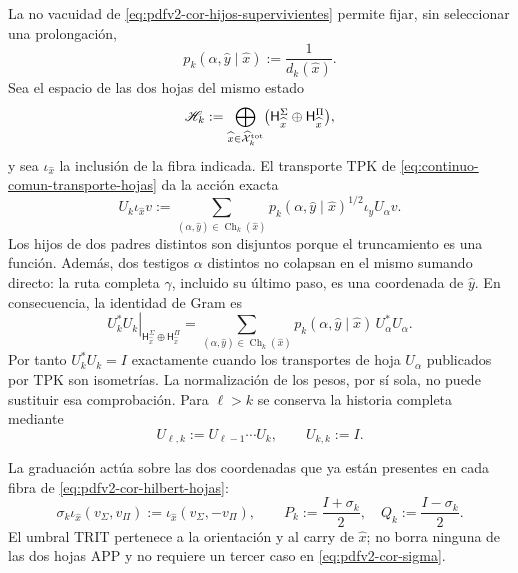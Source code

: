 La no vacuidad de \eqref{eq:pdfv2-cor-hijos-supervivientes} permite fijar,
sin seleccionar una prolongación,
\begin{equation}
\label{eq:pdfv2-cor-peso-conteo}
 p_k(\alpha,\widehat y\mid\widehat x)
 :=\frac1{d_k(\widehat x)}.
\end{equation}
Sea el espacio de las dos hojas del mismo estado
\begin{equation}
\label{eq:pdfv2-cor-hilbert-hojas}
 \mathscr H_k:=
 \bigoplus_{\widehat x\in\widehat{\mathcal X}^{\rm tot}_k}
 \bigl(\mathsf H_{\widehat x}^{\Sigma}
       \oplus\mathsf H_{\widehat x}^{\Pi}\bigr),
\end{equation}
y sea \(\iota_{\widehat x}\) la inclusión de la fibra indicada. El transporte
TPK de \eqref{eq:continuo-comun-transporte-hojas} da la acción exacta
\begin{equation}
\label{eq:pdfv2-cor-u-comun}
 U_k\iota_{\widehat x}v:=
 \sum_{(\alpha,\widehat y)\in\operatorname{Ch}_k(\widehat x)}
 p_k(\alpha,\widehat y\mid\widehat x)^{1/2}
 \iota_{\widehat y}U_\alpha v.
\end{equation}
Los hijos de dos padres distintos son disjuntos porque el truncamiento es una
función. Además, dos testigos \(\alpha\) distintos no colapsan en el mismo
sumando directo: la ruta completa \(\gamma\), incluido su último paso, es una
coordenada de \(\widehat y\). En consecuencia, la identidad de Gram es
\begin{equation}
\label{eq:pdfv2-cor-u-gram}
 \left.U_k^*U_k\right|_{\mathsf H_{\widehat x}^{\Sigma}
       \oplus\mathsf H_{\widehat x}^{\Pi}}
 =
 \sum_{(\alpha,\widehat y)\in\operatorname{Ch}_k(\widehat x)}
 p_k(\alpha,\widehat y\mid\widehat x)\,U_\alpha^*U_\alpha.
\end{equation}
Por tanto \(U_k^*U_k=I\) exactamente cuando los transportes de hoja
\(U_\alpha\) publicados por TPK son isometrías. La normalización de los pesos,
por sí sola, no puede sustituir esa comprobación.
Para \(\ell>k\) se conserva la historia completa mediante
\begin{equation}
\label{eq:pdfv2-cor-u-iterado}
 U_{\ell,k}:=U_{\ell-1}\cdots U_k,
 \qquad U_{k,k}:=I.
\end{equation}

La graduación actúa sobre las dos coordenadas que ya están presentes en cada
fibra de \eqref{eq:pdfv2-cor-hilbert-hojas}:
\begin{equation}
\label{eq:pdfv2-cor-sigma}
 \sigma_k\iota_{\widehat x}(v_\Sigma,v_\Pi)
 :=\iota_{\widehat x}(v_\Sigma,-v_\Pi),
\qquad
 P_k:=\frac{I+\sigma_k}{2},\quad
 Q_k:=\frac{I-\sigma_k}{2}.
\end{equation}
El umbral TRIT pertenece a la orientación y al carry de
\(\widehat x\); no borra ninguna de las dos hojas APP y no requiere un tercer
caso en \eqref{eq:pdfv2-cor-sigma}.

